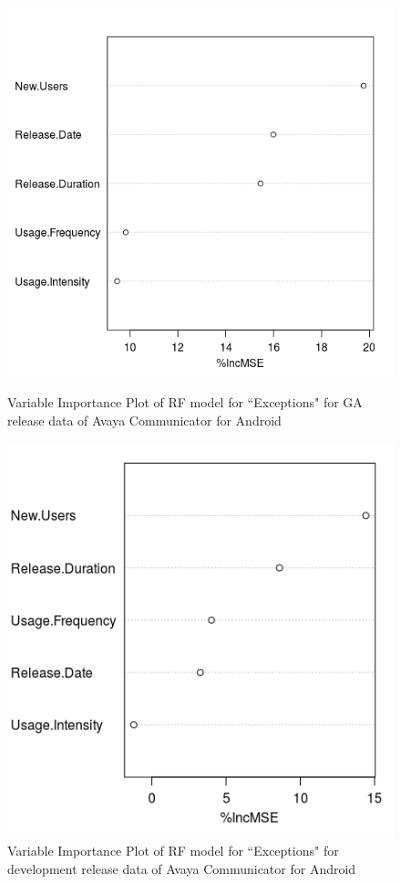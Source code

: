 \documentclass[smallextended]{svjour3}       %
\begin{document}
\begin{figure}[!t]
\centering
\begin{minipage}{.45\textwidth}
\includegraphics[width=\linewidth]{rfAGA}%
\caption{Variable Importance Plot of RF model for ``Exceptions" for GA release data of Avaya Communicator for Android}
\label{fig:rfAGA}
\end{minipage}
\hfill
\begin{minipage}{.45\textwidth}
\includegraphics[width=\linewidth]{rfAD}%
\caption{Variable Importance Plot of RF model for ``Exceptions" for development release data of Avaya Communicator for Android}
\label{fig:rfAD}
\end{minipage}
\end{figure}
\end{document}
